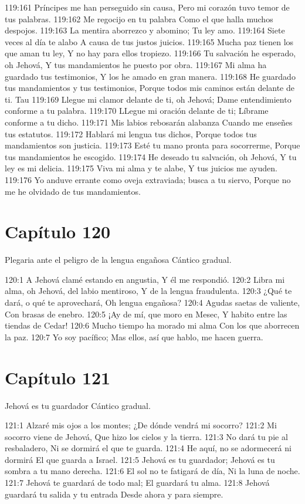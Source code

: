 119:161 Príncipes me han perseguido sin causa, 
Pero mi corazón tuvo temor de tus palabras. 
119:162 Me regocijo en tu palabra 
Como el que halla muchos despojos. 
119:163 La mentira aborrezco y abomino; 
Tu ley amo. 
119:164 Siete veces al día te alabo 
A causa de tus justos juicios. 
119:165 Mucha paz tienen los que aman tu ley, 
Y no hay para ellos tropiezo. 
119:166 Tu salvación he esperado, oh Jehová, 
Y tus mandamientos he puesto por obra. 
119:167 Mi alma ha guardado tus testimonios, 
Y los he amado en gran manera. 
119:168 He guardado tus mandamientos y tus testimonios, 
Porque todos mis caminos están delante de ti. 
Tau 
119:169 Llegue mi clamor delante de ti, oh Jehová; 
Dame entendimiento conforme a tu palabra. 
119:170 LLegue mi oración delante de ti; 
Líbrame conforme a tu dicho. 
119:171 Mis labios rebosarán alabanza 
Cuando me enseñes tus estatutos. 
119:172 Hablará mi lengua tus dichos, 
Porque todos tus mandamientos son justicia. 
119:173 Esté tu mano pronta para socorrerme, 
Porque tus mandamientos he escogido. 
119:174 He deseado tu salvación, oh Jehová, 
Y tu ley es mi delicia. 
119:175 Viva mi alma y te alabe, 
Y tus juicios me ayuden. 
119:176 Yo anduve errante como oveja extraviada; busca a tu siervo, 
Porque no me he olvidado de tus mandamientos. 
\section*{Capítulo 120}
Plegaria ante el peligro de la lengua engañosa 
Cántico gradual. 
 
120:1 A Jehová clamé estando en angustia, 
Y él me respondió. 
120:2 Libra mi alma, oh Jehová, del labio mentiroso, 
Y de la lengua fraudulenta. 
120:3 ¿Qué te dará, o qué te aprovechará, 
Oh lengua engañosa? 
120:4 Agudas saetas de valiente, 
Con brasas de enebro. 
120:5 ¡Ay de mí, que moro en Mesec, 
Y habito entre las tiendas de Cedar! 
120:6 Mucho tiempo ha morado mi alma 
Con los que aborrecen la paz. 
120:7 Yo soy pacífico; 
Mas ellos, así que hablo, me hacen guerra. 
\section*{Capítulo 121}
Jehová es tu guardador 
Cántico gradual. 
 
121:1 Alzaré mis ojos a los montes; 
¿De dónde vendrá mi socorro? 
121:2 Mi socorro viene de Jehová, 
Que hizo los cielos y la tierra. 
121:3 No dará tu pie al resbaladero, 
Ni se dormirá el que te guarda. 
121:4 He aquí, no se adormecerá ni dormirá 
El que guarda a Israel. 
121:5 Jehová es tu guardador; 
Jehová es tu sombra a tu mano derecha. 
121:6 El sol no te fatigará de día, 
Ni la luna de noche. 
121:7 Jehová te guardará de todo mal; 
El guardará tu alma. 
121:8 Jehová guardará tu salida y tu entrada 
Desde ahora y para siempre. 
